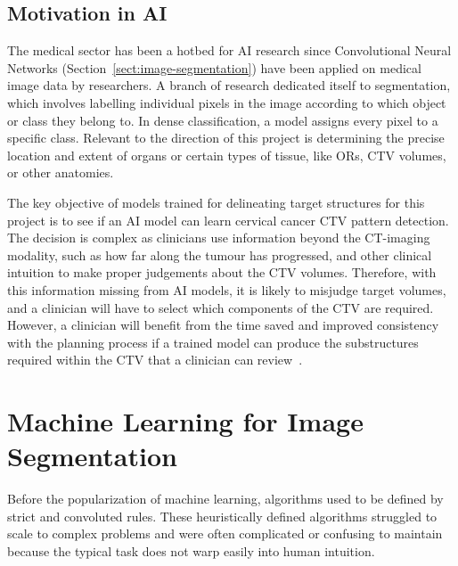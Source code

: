 \documentclass[11pt,twoside]{report}
\begin{document}
\subsection{Motivation in AI}

The medical sector has been a hotbed for AI research since  Convolutional Neural Networks (Section~\ref{sect:image-segmentation}) have been applied on medical image data by researchers. A branch of research dedicated itself to segmentation, which involves labelling individual pixels in the image according to which object or class they belong to. In dense classification, a model assigns every pixel to a specific class. Relevant to the direction of this project is determining the precise location and extent of organs or certain types of tissue, like ORs, CTV volumes, or other anatomies. 

The key objective of models trained for delineating target structures for this project is to see if an AI model can learn cervical cancer CTV pattern detection. The decision is complex as clinicians use information beyond the CT-imaging modality, such as how far along the tumour has progressed, and other clinical intuition to make proper judgements about the CTV volumes. Therefore, with this information missing from AI models, it is likely to misjudge target volumes, and a clinician will have to select which components of the CTV are required. However, a clinician will benefit from the time saved and improved consistency with the planning process if a trained model can produce the substructures required within the CTV that a clinician can review~\cite{AMLART-data}.

\section{Machine Learning for Image Segmentation}\label{sect:machine-learning-for-image-segmentation}

Before the popularization of machine learning, algorithms used to be defined by strict and convoluted rules. These heuristically defined algorithms struggled to scale to complex problems and were often complicated or confusing to maintain because the typical task does not warp easily into human intuition.
\end{document}
